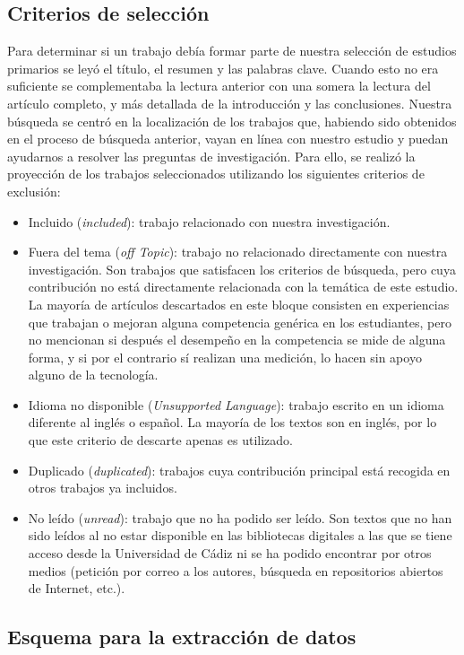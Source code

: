 \subsection{Criterios de selección}
\label{sec:CriteriosBusqueda}
Para determinar si un trabajo debía formar parte de nuestra selección de estudios primarios se leyó el título, el resumen y las palabras clave. Cuando esto no era suficiente se complementaba la lectura anterior con una somera la lectura del artículo completo, y más detallada de la introducción y las conclusiones.
Nuestra búsqueda se centró en la localización de los trabajos que, habiendo sido obtenidos en el proceso de búsqueda anterior, vayan en línea con nuestro estudio y puedan ayudarnos a resolver las preguntas de investigación. Para ello, se realizó la proyección de los trabajos seleccionados utilizando los siguientes criterios de exclusión:
\begin{itemize}
\item Incluido (\emph{included}): trabajo relacionado con nuestra investigación.
\item Fuera del tema (\emph{off Topic}): trabajo no relacionado directamente con nuestra investigación. Son trabajos que satisfacen los criterios de búsqueda, pero cuya contribución no está directamente relacionada con la temática de este estudio. La mayoría de artículos descartados en este bloque consisten en experiencias que trabajan o mejoran alguna competencia genérica en los estudiantes, pero no mencionan si después el desempeño en la competencia se mide de alguna forma, y si por el contrario sí realizan una medición, lo hacen sin apoyo alguno de la tecnología.
\item Idioma no disponible (\emph{Unsupported Language}): trabajo escrito en un idioma diferente al inglés o español. La mayoría de los textos son en inglés, por lo que este criterio de descarte apenas es utilizado.
\item Duplicado (\emph{duplicated}): trabajos cuya contribución principal está recogida en otros trabajos ya incluidos. 
\item No leído (\emph{unread}): trabajo que no ha podido ser leído. Son textos que no han sido leídos al no estar disponible en las bibliotecas digitales a las que se tiene acceso desde la Universidad de Cádiz ni se ha podido encontrar por otros medios (petición por correo a los autores, búsqueda en repositorios abiertos de Internet, etc.).
\end{itemize}

\subsection{Esquema para la extracción de datos}
\label{sec:EsquemaBusqueda}

